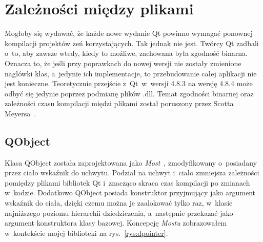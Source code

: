 
\section{Zależności między plikami}
Mogłoby się wydawać, że każde nowe wydanie Qt powinno wymagać ponownej kompilacji projektów zeń korzystających. Tak jednak nie jest. Twórcy Qt zadbali o~to, aby zawsze wtedy, kiedy to możliwe, zachowana była zgodność binarna. Oznacza to, że jeśli przy poprawkach do nowej wersji nie zostały zmienione nagłówki klas, a~jedynie ich implementacje, to przebudowanie całej aplikacji nie jest konieczne. Teoretycznie przejście z~Qt~w~wersji 4.8.3 na wersję 4.8.4 może odbyć się jedynie poprzez podmianę plików .dll. Temat zgodności binarnej oraz zależności czasu kompilacji międzi plikami został poruszony przez Scotta Meyersa~\cite[150-158]{50Ways}.

\subsection{QObject}
Klasa QObject została zaprojektowana jako \textit{Most}~\cite[181-190]{Patterns}, zmodyfikowany o~posiadany przez ciało wskaźnik do uchwytu. Podział na uchwyt i~ciało zmniejsza zależności pomiędzy plikami bibliotek Qt i~znacząco skraca czas kompilacji po zmianach w~kodzie. Dodatkowo QObject posiada konstruktor przyjmujący jako argument wskaźnik do ciała, dzięki czemu można je zaalokować tylko raz, w~klasie najniższego poziomu hierarchii dziedziczenia, a~następnie przekazać jako argument konstruktora klasy bazowej. 
Koncepcję \textit{Mostu} zobrazowałem w~kontekście mojej biblioteki na rys.~\ref{rys:dpointer}.\newline

